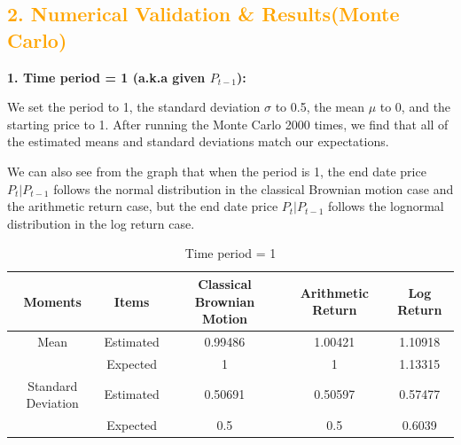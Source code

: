 \documentclass[11pt,en]{elegantpaper}
\begin{document}
\subsection*{\textcolor{orange}{2. Numerical Validation \& Results(Monte Carlo)}}

\textbf{1. Time period = 1 (a.k.a given $P_{t-1}$):}

We set the period to 1, the standard deviation $\sigma$ to 0.5, the mean $\mu$ to 0, and the starting price to 1. After running the Monte Carlo 2000 times, we find that all of the estimated means and standard deviations match our expectations. 

We can also see from the graph that when the period is 1, the end date price $P_t|P_{t-1}$ follows the normal distribution in the classical Brownian motion case and the arithmetic return case, but the end date price $P_t|P_{t-1}$ follows the lognormal distribution in the log return case.

\begin{table}[htbp]
    \centering
    \caption{Time period = 1}
    \label{table1}
    \begin{tabular}{@{}ccccc@{}}
        \toprule
        \textbf{Moments} & \textbf{Items} & \textbf{Classical Brownian Motion} & \textbf{Arithmetic Return} & \textbf{Log Return}\\
        \midrule
        Mean & Estimated  & 0.99486 & 1.00421 & 1.10918 \\
        & Expected  & 1       & 1       & 1.13315 \\
        Standard Deviation& Estimated  & 0.50691 & 0.50597 & 0.57477 \\
        & Expected & 0.5     & 0.5     & 0.6039 \\
        \bottomrule
    \end{tabular}
\end{table}
\end{document}
